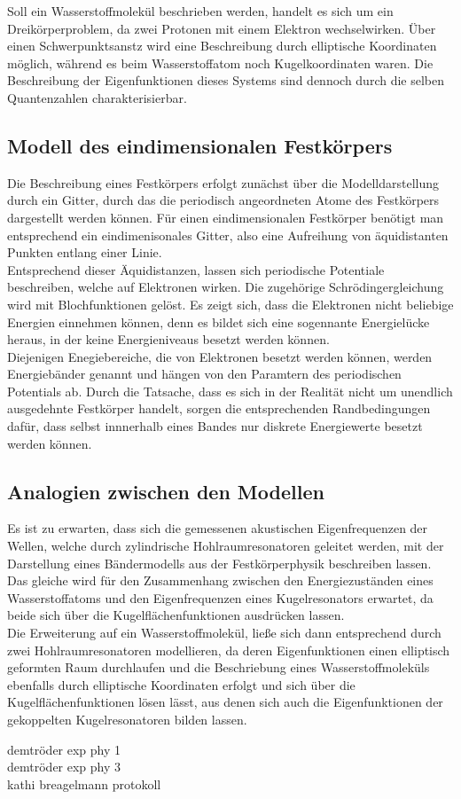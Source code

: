 Soll ein Wasserstoffmolekül beschrieben werden, handelt es sich um ein Dreikörperproblem,
da zwei Protonen mit einem Elektron wechselwirken. Über einen Schwerpunktsanstz wird
eine Beschreibung durch elliptische Koordinaten möglich, während es beim Wasserstoffatom noch 
Kugelkoordinaten waren. Die Beschreibung der Eigenfunktionen dieses Systems sind dennoch durch 
die selben Quantenzahlen charakterisierbar.

\subsection{Modell des eindimensionalen Festkörpers}
Die Beschreibung eines Festkörpers erfolgt zunächst über die Modelldarstellung durch ein 
Gitter, durch das die periodisch angeordneten Atome des Festkörpers dargestellt werden können.
Für einen eindimensionalen Festkörper benötigt man entsprechend ein eindimenisonales Gitter,
also eine Aufreihung von äquidistanten Punkten entlang einer Linie.\\

Entsprechend dieser Äquidistanzen, lassen sich periodische Potentiale beschreiben, 
welche auf Elektronen wirken. Die zugehörige Schrödingergleichung wird mit 
Blochfunktionen gelöst. Es zeigt sich, dass die Elektronen nicht beliebige Energien 
einnehmen können, denn es bildet sich eine sogennante Energielücke heraus, in der 
keine Energieniveaus besetzt werden können.\\

Diejenigen Enegiebereiche, die von Elektronen besetzt werden können, werden Energiebänder 
genannt und hängen von den Paramtern des periodischen Potentials ab. Durch die 
Tatsache, dass es sich in der Realität nicht um unendlich ausgedehnte Festkörper handelt, 
sorgen die entsprechenden Randbedingungen dafür, dass selbst innnerhalb eines Bandes 
nur diskrete Energiewerte besetzt werden können.\\

\subsection{Analogien zwischen den Modellen}
Es ist zu erwarten, dass sich die gemessenen akustischen Eigenfrequenzen der Wellen,
welche durch zylindrische Hohlraumresonatoren geleitet werden, mit der Darstellung eines
Bändermodells aus der Festkörperphysik beschreiben lassen.\\
Das gleiche wird für den Zusammenhang zwischen den Energiezuständen eines 
Wasserstoffatoms und den Eigenfrequenzen eines Kugelresonators erwartet, 
da beide sich über die 
Kugelflächenfunktionen ausdrücken lassen.\\
Die Erweiterung auf ein Wasserstoffmolekül, ließe sich dann entsprechend durch 
zwei Hohlraumresonatoren modellieren, da deren Eigenfunktionen einen elliptisch 
geformten Raum durchlaufen und die Beschriebung eines Wasserstoffmoleküls ebenfalls 
durch elliptische Koordinaten erfolgt und sich über die Kugelflächenfunktionen
lösen lässt, aus denen sich auch die Eigenfunktionen der gekoppelten Kugelresonatoren 
bilden lassen. 

\cite{sample}
demtröder exp phy 1\\
demtröder exp phy 3\\
kathi breagelmann protokoll\\
